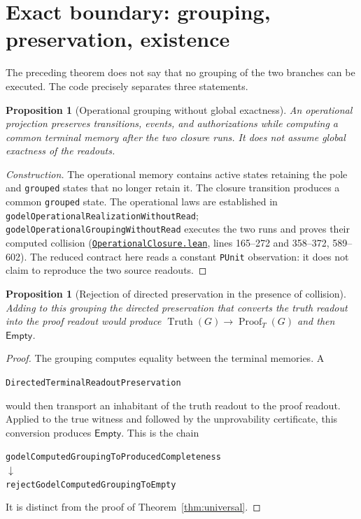 \documentclass[11pt,a4paper]{article}
\newcommand{\Truth}{\operatorname{Truth}}
\newcommand{\Proof}{\operatorname{Proof}}
\newcommand{\Empty}{\mathsf{Empty}}
\newcommand{\code}[1]{\nolinkurl{#1}}
\newcommand{\SourceAt}[3]{\href{https://github.com/JohnDoe-collab-stack/relational-perimeter/blob/1e5aeda745559d62a3819bb3213da7fce3c31ad1/#1\#L#2}{\nolinkurl{#3}}}
\newtheorem{proposition}[theorem]{Proposition}
\theoremstyle{remark}
\begin{document}
\section{Exact boundary: grouping, preservation, existence}
\label{sec:frontier}

The preceding theorem does not say that no grouping of the two branches can
be executed. The code precisely separates three statements.

\begin{proposition}[Operational grouping without global exactness]
An operational projection preserves transitions, events, and authorizations
while computing a common terminal memory after the two closure runs. It does
not assume global exactness of the readouts.
\end{proposition}
\begin{proof}[Construction]
The operational memory contains active states retaining the pole and
\code{grouped} states that no longer retain it. The closure transition
produces a common \code{grouped} state. The operational laws are established
in \code{godelOperationalRealizationWithoutRead};
\code{godelOperationalGroupingWithoutRead} executes the two runs and proves
their computed collision
(\SourceAt{RelationalPerimeter/Constitution/Godel/OperationalClosure.lean}{589-L602}{OperationalClosure.lean},
lines 165--272 and 358--372, 589--602). The reduced contract here reads a
constant \code{PUnit} observation: it does not claim to reproduce the two
source readouts.
\end{proof}

\begin{proposition}[Rejection of directed preservation in the presence of collision]
Adding to this grouping the directed preservation that converts the truth
readout into the proof readout would produce
$\Truth(G)\to\Proof_T(G)$ and then $\Empty$.
\end{proposition}
\begin{proof}
The grouping computes equality between the terminal memories. A
\begin{center}
\code{DirectedTerminalReadoutPreservation}
\end{center}
would then transport an inhabitant of the truth readout to the proof
readout. Applied to the true witness and followed by the unprovability
certificate, this conversion produces $\Empty$. This is the chain
\begin{center}
\code{godelComputedGroupingToProducedCompleteness}\\[2pt]
$\downarrow$\\[2pt]
\code{rejectGodelComputedGroupingToEmpty}
\end{center}
It is distinct from the proof of Theorem~\ref{thm:universal}.
\end{proof}
\end{document}
